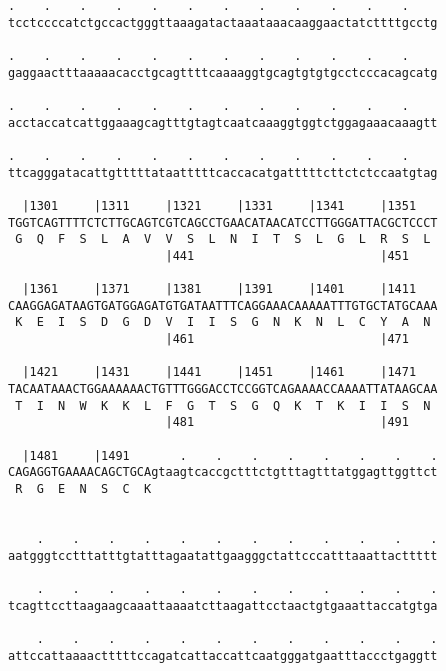\documentclass{article}
\begin{document}
\begin{Verbatim}
.    .    .    .    .    .    .    .    .    .    .    .    
tcctccccatctgccactgggttaaagatactaaataaacaaggaactatcttttgcctg
                                                            
.    .    .    .    .    .    .    .    .    .    .    .    
gaggaactttaaaaacacctgcagttttcaaaaggtgcagtgtgtgcctcccacagcatg
                                                            
.    .    .    .    .    .    .    .    .    .    .    .    
acctaccatcattggaaagcagtttgtagtcaatcaaaggtggtctggagaaacaaagtt
                                                            
.    .    .    .    .    .    .    .    .    .    .    .    
ttcagggatacattgtttttataatttttcaccacatgatttttcttctctccaatgtag
                                                            
  |1301     |1311     |1321     |1331     |1341     |1351   
TGGTCAGTTTTCTCTTGCAGTCGTCAGCCTGAACATAACATCCTTGGGATTACGCTCCCT
 G  Q  F  S  L  A  V  V  S  L  N  I  T  S  L  G  L  R  S  L 
                      |441                          |451    
  
  |1361     |1371     |1381     |1391     |1401     |1411   
CAAGGAGATAAGTGATGGAGATGTGATAATTTCAGGAAACAAAAATTTGTGCTATGCAAA
 K  E  I  S  D  G  D  V  I  I  S  G  N  K  N  L  C  Y  A  N 
                      |461                          |471    
  
  |1421     |1431     |1441     |1451     |1461     |1471   
TACAATAAACTGGAAAAAACTGTTTGGGACCTCCGGTCAGAAAACCAAAATTATAAGCAA
 T  I  N  W  K  K  L  F  G  T  S  G  Q  K  T  K  I  I  S  N 
                      |481                          |491    
  
  |1481     |1491       .    .    .    .    .    .    .    .
CAGAGGTGAAAACAGCTGCAgtaagtcaccgctttctgtttagtttatggagttggttct
 R  G  E  N  S  C  K                                        
                                                            
  
    .    .    .    .    .    .    .    .    .    .    .    .
aatgggtcctttatttgtatttagaatattgaagggctattcccatttaaattacttttt
                                                            
    .    .    .    .    .    .    .    .    .    .    .    .
tcagttccttaagaagcaaattaaaatcttaagattcctaactgtgaaattaccatgtga
                                                            
    .    .    .    .    .    .    .    .    .    .    .    .
attccattaaaactttttccagatcattaccattcaatgggatgaatttaccctgaggtt
                                                            

\end{Verbatim}
\end{document}
